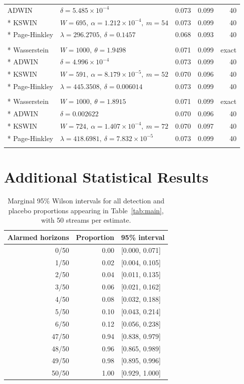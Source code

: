 \documentclass[preprint,12pt]{elsarticle}
\begin{document}
\begin{longtable}{llrrr}
ADWIN & $\delta=5.485\times10^{-4}$ & 0.073 & 0.099 & 40\\*
KSWIN & $W=695,\ \alpha=1.212\times10^{-4},\ m=54$ & 0.073 & 0.099 & 40\\*
Page-Hinkley & $\lambda=296.2705,\ \delta=0.1457$ & 0.068 & 0.093 & 40\\
\addlinespace
\multicolumn{5}{l}{\textit{River Friedman (shared)}}\\*
Wasserstein & $W=1000,\ \theta=1.9498$ & 0.071 & 0.099 & exact\\*
ADWIN & $\delta=4.996\times10^{-4}$ & 0.073 & 0.099 & 40\\*
KSWIN & $W=591,\ \alpha=8.179\times10^{-5},\ m=52$ & 0.070 & 0.096 & 40\\*
Page-Hinkley & $\lambda=445.3508,\ \delta=0.006014$ & 0.073 & 0.099 & 40\\
\addlinespace
\multicolumn{5}{l}{\textit{Bimodal shift}}\\*
Wasserstein & $W=1000,\ \theta=1.8915$ & 0.071 & 0.099 & exact\\*
ADWIN & $\delta=0.002622$ & 0.070 & 0.096 & 40\\*
KSWIN & $W=724,\ \alpha=1.407\times10^{-4},\ m=72$ & 0.070 & 0.097 & 40\\*
Page-Hinkley & $\lambda=418.6981,\ \delta=7.832\times10^{-5}$ & 0.073 & 0.099 & 40\\
\addlinespace
\end{longtable}\endgroup
\clearpage


\section{Additional Statistical Results}\label{app:statistics}
\begin{table}[htbp]\centering\small
\caption{Marginal 95\% Wilson intervals for all detection and placebo proportions appearing in Table~\ref{tab:main}, with 50 streams per estimate.}\label{tab:wilson}
\begin{tabular}{rrl}
\toprule
Alarmed horizons & Proportion & 95\% interval\\\midrule
0/50 & 0.00 & [0.000, 0.071]\\
1/50 & 0.02 & [0.004, 0.105]\\
2/50 & 0.04 & [0.011, 0.135]\\
3/50 & 0.06 & [0.021, 0.162]\\
4/50 & 0.08 & [0.032, 0.188]\\
5/50 & 0.10 & [0.043, 0.214]\\
6/50 & 0.12 & [0.056, 0.238]\\
47/50 & 0.94 & [0.838, 0.979]\\
48/50 & 0.96 & [0.865, 0.989]\\
49/50 & 0.98 & [0.895, 0.996]\\
50/50 & 1.00 & [0.929, 1.000]\\
\bottomrule\end{tabular}\end{table}
\end{document}
